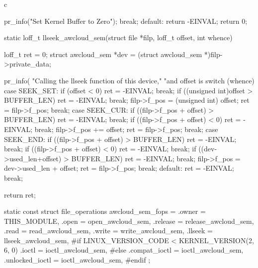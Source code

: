 \begin{code-block}{c}
{{{                pr_info("Set Kernel Buffer to Zero\n");
                break;
        default:
                return -EINVAL;
        }
        return 0;
}

static loff_t llseek_awcloud_sem(struct file *filp,
        loff_t offset, int whence)
{
        loff_t ret = 0;
        struct awcloud_sem *dev = (struct awcloud_sem *)filp->private_data;

        pr_info(
                "Calling the llseek function of this device,"
                "and offset is %
        switch (whence) {
        case SEEK_SET:
                if (offset < 0) {
                        ret = -EINVAL;
                        break;
                }
                if ((unsigned int)offset > BUFFER_LEN) {
                        ret = -EINVAL;
                        break;
                }
                filp->f_pos = (unsigned int) offset;
                ret = filp->f_pos;
                break;
        case SEEK_CUR:
                if ((filp->f_pos + offset) > BUFFER_LEN) {
                        ret = -EINVAL;
                        break;
                }
                if ((filp->f_pos + offset) < 0) {
                        ret = -EINVAL;
                        break;
                }
                filp->f_pos += offset;
                ret = filp->f_pos;
                break;
        case SEEK_END:
                if ((filp->f_pos + offset) > BUFFER_LEN) {
                        ret = -EINVAL;
                        break;
                }
                if ((filp->f_pos + offset) < 0) {
                        ret = -EINVAL;
                        break;
                }
                if ((dev->used_len+offset) > BUFFER_LEN) {
                        ret = -EINVAL;
                        break;
                }
                filp->f_pos = dev->used_len + offset;
                ret = filp->f_pos;
                break;
        default:
                ret = -EINVAL;
                break;
        }

        return ret;
}

static const struct file_operations awcloud_sem_fops = {
        .owner   = THIS_MODULE,
        .open    = open_awcloud_sem,
        .release = release_awcloud_sem,
        .read    = read_awcloud_sem,
        .write   = write_awcloud_sem,
        .llseek  = llseek_awcloud_sem,
#if LINUX_VERSION_CODE < KERNEL_VERSION(2, 6, 0)
        .ioctl   = ioctl_awcloud_sem,
#else
        .compat_ioctl = ioctl_awcloud_sem,
        .unlocked_ioctl = ioctl_awcloud_sem,
#endif
};

}
\end{code-block}
